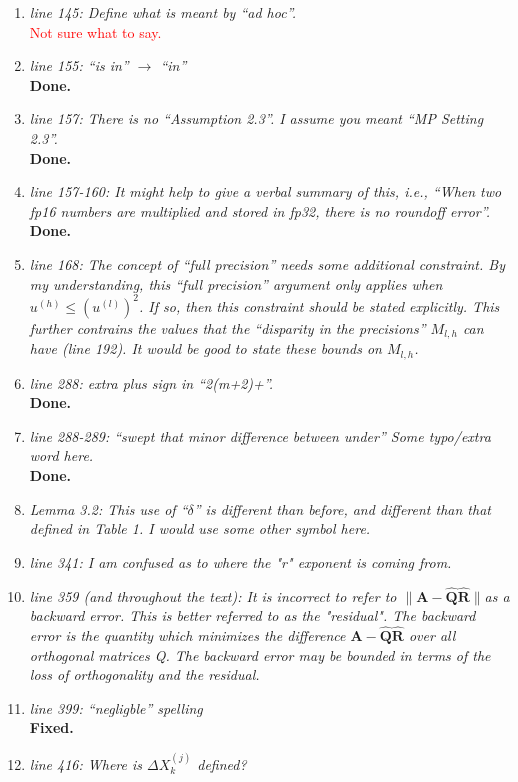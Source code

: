 \documentclass[final,onefignum,onetabnum]{siamart190516}
\newcommand{\bb}[1]{\mathbf{#1}}
\newcommand{\red}[1]{\textcolor{red}{#1}}
\begin{document}
\begin{enumerate}
    {\bf Done.}
    \item {\it line 145: Define what is meant by ``ad hoc''. }\\
    \red{Not sure what to say.}
    \item {\it line 155: ``is in'' $\rightarrow $ ``in'' }\\
    {\bf Done.}
    \item {\it line 157: There is no ``Assumption 2.3''. I assume you meant ``MP Setting 2.3''. }\\
    {\bf Done.}
    \item {\it line 157-160: It might help to give a verbal summary of this, i.e., ``When two fp16 numbers are multiplied and stored in fp32, there is no roundoff error''. }\\
    {\bf Done.}
    \item {\it line 168: The concept of ``full precision'' needs some additional constraint. By my understanding, this ``full precision'' argument only applies when $u^{(h)} \leq (u^{(l)})^2$. If so, then this constraint should be stated explicitly. This further contrains the values that the ``disparity in the precisions'' $M_{l,h}$ can have (line 192). It would be good to state these bounds on $M_{l,h}$. }
    \item {\it line 288: extra plus sign in ``2(m+2)+''. }\\
    {\bf Done.}
    \item {\it line 288-289: ``swept that minor difference between under'' Some typo/extra word here. }\\
    {\bf Done.}
    \item {\it Lemma 3.2: This use of ``$\delta$'' is different than before, and different than that defined in Table 1. I would use some other symbol here. }
    \item {\it line 341: I am confused as to where the "r" exponent is coming from. }
    \item {\it line 359 (and throughout the text): It is incorrect to refer to $\|\bb{A}-\hat{\bb{Q}}\hat{\bb{R}}\|$as a backward error. This is better referred to as the "residual". The backward error is the quantity which minimizes the difference $\bb{A}-\hat{\bb{Q}}\hat{\bb{R}}$ over all orthogonal matrices Q. The backward error may be bounded in terms of the loss of orthogonality and the residual. }
    \item {\it line 399: ``negligble'' spelling }\\
    {\bf Fixed.}
    \item {\it line 416: Where is $\Delta X_k^{(j)}$ defined? }

\end{enumerate}
\end{document}
